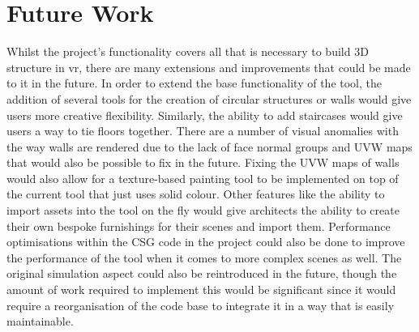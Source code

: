 \section{Future Work}

    Whilst the project's functionality covers all that is necessary to build 3D structure in \acrshort{vr}, there are many extensions and improvements that could be made to it in the future. In order to extend the base functionality of the tool, the addition of several tools for the creation of circular structures or walls would give users more creative flexibility. Similarly, the ability to add staircases would give users a way to tie floors together. There are a number of visual anomalies with the way walls are rendered due to the lack of face normal groups and UVW maps that would also be possible to fix in the future. Fixing the UVW maps of walls would also allow for a texture-based painting tool to be implemented on top of the current tool that just uses solid colour. Other features like the ability to import assets into the tool on the fly would give architects the ability to create their own bespoke furnishings for their scenes and import them. Performance optimisations within the CSG code in the project could also be done to improve the performance of the tool when it comes to more complex scenes as well. The original simulation aspect could also be reintroduced in the future, though the amount of work required to implement this would be significant since it would require a reorganisation of the code base to integrate it in a way that is easily maintainable.